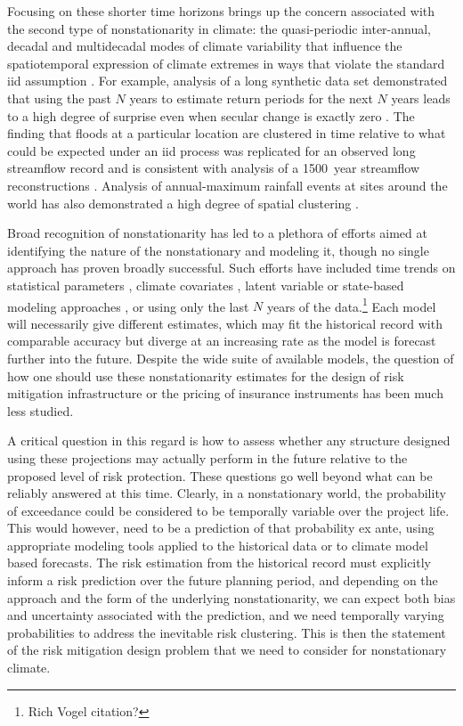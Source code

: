 \documentclass[12pt]{article}
\begin{document}
Focusing on these shorter time horizons brings up the concern associated with the second type of nonstationarity in climate: the quasi-periodic inter-annual, decadal and multidecadal modes of climate variability that influence the spatiotemporal expression of climate extremes in ways that violate the standard \gls{iid} assumption \citep{Matalas2012,Hannachi2017}.
For example, analysis of a long synthetic data set demonstrated that using the past $N$ years to estimate return periods for the next $N$ years leads to a high degree of surprise even when secular change is exactly zero \citep{Jain2001}.
The finding that floods at a particular location are clustered in time relative to what could be expected under an \gls{iid} process was replicated for an observed long streamflow record \citep{Jain2001} and is consistent with analysis of a \SI{1500}{year} streamflow reconstructions \citep{Swierczynski2012}.
Analysis of annual-maximum rainfall events at sites around the world has also demonstrated a high degree of spatial clustering \citep{Bonnafous2017a}.

Broad recognition of nonstationarity has led to a plethora of efforts aimed at identifying the nature of the nonstationary and modeling it, though no single approach has proven broadly successful.
Such efforts have included time trends on statistical parameters \citep{Strupczewski2001,Vogel2011,Obeysekera2014,Serinaldi2015}, climate covariates \citep{Griffis2007,Sun2014,Hall2014,Delgado2014,Silva2016}, latent variable or state-based modeling approaches \citep{Waylen1986,Sveinsson2005,Griffis2007}, or using only the last $N$ years of the data.\footnote{Rich Vogel citation?}
Each model will necessarily give different estimates, which may fit the historical record with comparable accuracy but diverge at an increasing rate as the model is forecast further into the future.
Despite the wide suite of available models, the question of how one should use these nonstationarity estimates for the design of risk mitigation infrastructure or the pricing of insurance instruments has been much less studied.

A critical question in this regard is how to assess whether any structure designed using these projections may actually perform in the future relative to the proposed level of risk protection.
These questions go well beyond what can be reliably answered at this time.
Clearly, in a nonstationary world, the probability of exceedance could be considered to be temporally variable over the project life.
This would however, need to be a prediction of that probability ex ante, using appropriate modeling tools applied to the historical data or to climate model based forecasts.
The risk estimation from the historical record must explicitly inform a risk prediction over the future planning period, and depending on the approach and the form of the underlying nonstationarity, we can expect both bias and uncertainty associated with the prediction, and we need temporally varying probabilities to address the inevitable risk clustering.
This is then the statement of the risk mitigation design problem that we need to consider for nonstationary climate.
\end{document}
